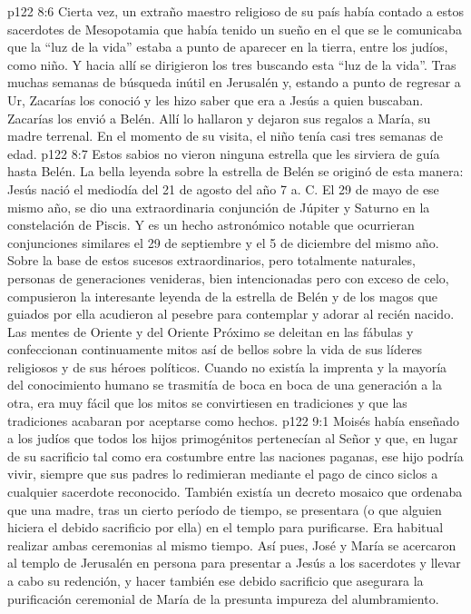 \vs p122 8:6 Cierta vez, un extraño maestro religioso de su país había contado a estos sacerdotes de Mesopotamia que había tenido un sueño en el que se le comunicaba que la “luz de la vida” estaba a punto de aparecer en la tierra, entre los judíos, como niño. Y hacia allí se dirigieron los tres buscando esta “luz de la vida”. Tras muchas semanas de búsqueda inútil en Jerusalén y, estando a punto de regresar a Ur, Zacarías los conoció y les hizo saber que era a Jesús a quien buscaban. Zacarías los envió a Belén. Allí lo hallaron y dejaron sus regalos a María, su madre terrenal. En el momento de su visita, el niño tenía casi tres semanas de edad.
\vs p122 8:7 Estos sabios no vieron ninguna estrella que les sirviera de guía hasta Belén. La bella leyenda sobre la estrella de Belén se originó de esta manera: Jesús nació el mediodía del 21 de agosto del año 7 a. C. El 29 de mayo de ese mismo año, se dio una extraordinaria conjunción de Júpiter y Saturno en la constelación de Piscis. Y es un hecho astronómico notable que ocurrieran conjunciones similares el 29 de septiembre y el 5 de diciembre del mismo año. Sobre la base de estos sucesos extraordinarios, pero totalmente naturales, personas de generaciones venideras, bien intencionadas pero con exceso de celo, compusieron la interesante leyenda de la estrella de Belén y de los magos que guiados por ella acudieron al pesebre para contemplar y adorar al recién nacido. Las mentes de Oriente y del Oriente Próximo se deleitan en las fábulas y confeccionan continuamente mitos así de bellos sobre la vida de sus líderes religiosos y de sus héroes políticos. Cuando no existía la imprenta y la mayoría del conocimiento humano se trasmitía de boca en boca de una generación a la otra, era muy fácil que los mitos se convirtiesen en tradiciones y que las tradiciones acabaran por aceptarse como hechos.
\vs p122 9:1 Moisés había enseñado a los judíos que todos los hijos primogénitos pertenecían al Señor y que, en lugar de su sacrificio tal como era costumbre entre las naciones paganas, ese hijo podría vivir, siempre que sus padres lo redimieran mediante el pago de cinco siclos a cualquier sacerdote reconocido. También existía un decreto mosaico que ordenaba que una madre, tras un cierto período de tiempo, se presentara (o que alguien hiciera el debido sacrificio por ella) en el templo para purificarse. Era habitual realizar ambas ceremonias al mismo tiempo. Así pues, José y María se acercaron al templo de Jerusalén en persona para presentar a Jesús a los sacerdotes y llevar a cabo su redención, y hacer también ese debido sacrificio que asegurara la purificación ceremonial de María de la presunta impureza del alumbramiento.
